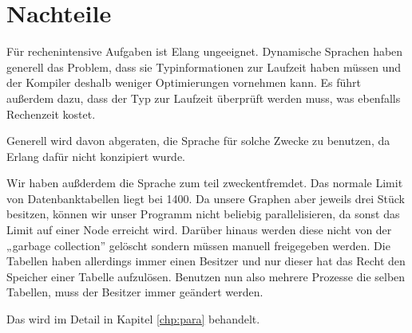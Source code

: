 \section{Nachteile}
Für rechenintensive Aufgaben ist Elang ungeeignet.  Dynamische
Sprachen haben generell das Problem, dass sie Typinformationen zur
Laufzeit haben müssen und der Kompiler deshalb weniger Optimierungen
vornehmen kann.  Es führt außerdem dazu, dass der Typ zur Laufzeit
überprüft werden muss, was ebenfalls Rechenzeit kostet.

Generell wird davon abgeraten, die Sprache für solche Zwecke zu
benutzen, da Erlang dafür nicht konzipiert wurde.
\cite[Kapitel~3]{lyse}

Wir haben außderdem die Sprache zum teil zweckentfremdet.  Das normale
Limit von Datenbanktabellen liegt bei 1400.  Da unsere Graphen aber
jeweils drei Stück besitzen, können wir unser Programm nicht beliebig
parallelisieren, da sonst das Limit auf einer Node erreicht wird.
Darüber hinaus werden diese nicht von der „garbage collection”
gelöscht sondern müssen manuell freigegeben werden.  Die Tabellen
haben allerdings immer einen Besitzer und nur dieser hat das Recht den
Speicher einer Tabelle aufzulösen.  Benutzen nun also mehrere Prozesse
die selben Tabellen, muss der Besitzer immer geändert werden.

Das wird im Detail in Kapitel \ref{chp:para}
behandelt.
